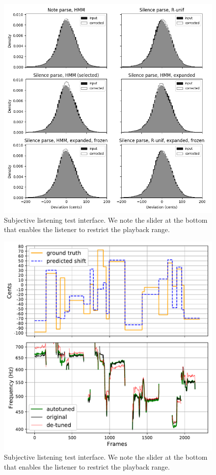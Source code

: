 \begin{figure}[t]
    \centering
    \includegraphics[width=\columnwidth]{figures/mir-1k-comparison.png}
    \caption{Subjective listening test interface. We note the slider at the bottom that enables the listener to restrict the playback range.}
    \label{fig:listening-test-ide}
\end{figure}

\begin{figure}[t]
    \centering
    \includegraphics[width=\columnwidth]{figures/results.pdf}
    \caption{Subjective listening test interface. We note the slider at the bottom that enables the listener to restrict the playback range.}
    \label{fig:listening-test-ide}
\end{figure}

